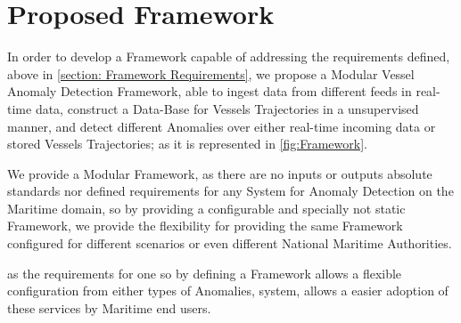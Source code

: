 

\section{Proposed Framework}
In order to develop a Framework capable of addressing the requirements defined, above in \ref{section: Framework Requirements}, we propose a Modular Vessel Anomaly Detection Framework, able to ingest data from different feeds in real-time data, construct a Data-Base for Vessels Trajectories in a unsupervised manner, and detect different Anomalies over either real-time incoming data or stored Vessels Trajectories; as it is represented in \ref{fig:Framework}.

We provide a Modular Framework, as there are no inputs or outputs absolute standards nor defined requirements for any System for Anomaly Detection on the Maritime domain, so by providing a configurable and specially not static Framework, we provide the flexibility for providing the same Framework configured for different scenarios or even different National Maritime Authorities.

as the requirements for one so by defining a Framework allows a flexible configuration from either types of Anomalies, system, allows a easier adoption of these services by Maritime end users. 


